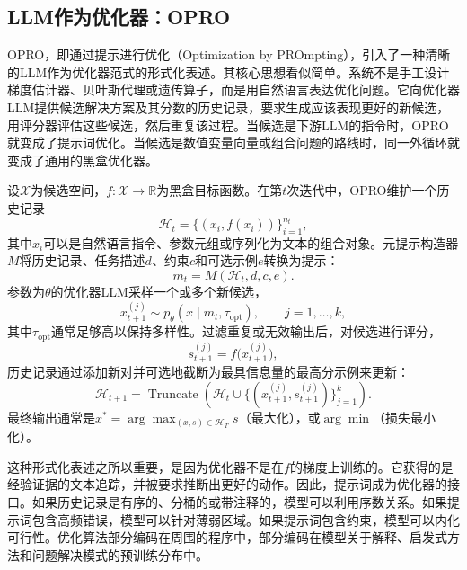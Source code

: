 \subsection{LLM作为优化器：OPRO}
\label{subsec:opro}

OPRO，即通过提示进行优化（Optimization by PROmpting），引入了一种清晰的LLM作为优化器范式的形式化表述\cite{opro2023}。其核心思想看似简单。系统不是手工设计梯度估计器、贝叶斯代理或遗传算子，而是用自然语言表达优化问题。它向优化器LLM提供候选解决方案及其分数的历史记录，要求生成应该表现更好的新候选，用评分器评估这些候选，然后重复该过程。当候选是下游LLM的指令时，OPRO就变成了提示词优化。当候选是数值变量向量或组合问题的路线时，同一外循环就变成了通用的黑盒优化器。

设$\mathcal{X}$为候选空间，$f:\mathcal{X}\rightarrow\mathbb{R}$为黑盒目标函数。在第$t$次迭代中，OPRO维护一个历史记录
\begin{equation}
  \mathcal{H}_t = \{(x_i, f(x_i))\}_{i=1}^{n_t},
\end{equation}
其中$x_i$可以是自然语言指令、参数元组或序列化为文本的组合对象。元提示构造器$M$将历史记录、任务描述$d$、约束$c$和可选示例$e$转换为提示：
\begin{equation}
  m_t = M(\mathcal{H}_t, d, c, e).
\end{equation}
参数为$\theta$的优化器LLM采样一个或多个新候选，
\begin{equation}
  x_{t+1}^{(j)} \sim p_\theta(x \mid m_t, \tau_{\mathrm{opt}}), \qquad j=1,\ldots,k,
\end{equation}
其中$\tau_{\mathrm{opt}}$通常足够高以保持多样性。过滤重复或无效输出后，对候选进行评分，
\begin{equation}
  s_{t+1}^{(j)} = f\bigl(x_{t+1}^{(j)}\bigr),
\end{equation}
历史记录通过添加新对并可选地截断为最具信息量的最高分示例来更新：
\begin{equation}
  \mathcal{H}_{t+1} = \operatorname{Truncate}\left(\mathcal{H}_{t}\cup\{(x_{t+1}^{(j)}, s_{t+1}^{(j)})\}_{j=1}^{k}\right).
\end{equation}
最终输出通常是$x^*=\arg\max_{(x,s)\in\mathcal{H}_T}s$（最大化），或$\arg\min$（损失最小化）。

这种形式化表述之所以重要，是因为优化器不是在$f$的梯度上训练的。它获得的是经验证据的文本追踪，并被要求推断出更好的动作。因此，提示词成为优化器的接口。如果历史记录是有序的、分桶的或带注释的，模型可以利用序数关系。如果提示词包含高频错误，模型可以针对薄弱区域。如果提示词包含约束，模型可以内化可行性。优化算法部分编码在周围的程序中，部分编码在模型关于解释、启发式方法和问题解决模式的预训练分布中。

